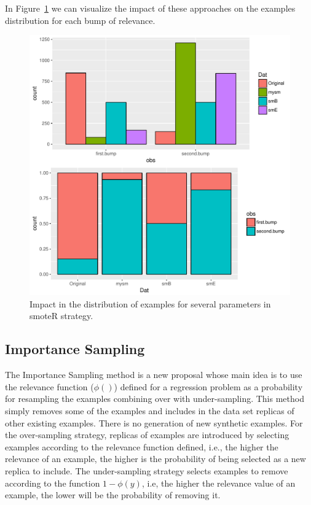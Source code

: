 \documentclass[10pt,a4paper]{article}\usepackage[]{graphicx}\usepackage[]{color}
\makeatletter
\def\maxwidth{ %
  \ifdim\Gin@nat@width>\linewidth
    \linewidth
  \else
    \Gin@nat@width
  \fi
}
\newenvironment{knitrout}{}{} %
\makeatother
\begin{document}
In Figure~\ref{fig:smoteR_1bar} we can visualize the impact of these approaches on the examples distribution for each bump of relevance.

\begin{knitrout}\footnotesize
{}\color{fgcolor}\begin{figure}

{\centering \includegraphics[width=\maxwidth,height=0.5\textheight]{figures/UBL-smoteR_1bar-1} 

}

\caption[Impact in the distribution of examples for several parameters in smoteR strategy]{Impact in the distribution of examples for several parameters in smoteR strategy. }\label{fig:smoteR_1bar}
\end{figure}


\end{knitrout}



\subsection{Importance Sampling}\label{sec:ISRegress}

The Importance Sampling method is a new proposal whose main idea is to use the relevance function ($\phi()$) defined for a regression problem as a probability for resampling the examples combining over with under-sampling. This method simply removes some of the examples and includes in the data set replicas of other existing examples. There is no generation of new synthetic examples. For the over-sampling strategy, replicas of examples are introduced by selecting examples according to the relevance function defined, i.e., the higher the relevance of an example, the higher is the probability of being selected as a new replica to include. The under-sampling strategy selects examples to remove according to the function $1-\phi(y)$, i.e, the higher the relevance value of an example, the lower will be the probability of removing it.
\end{document}
